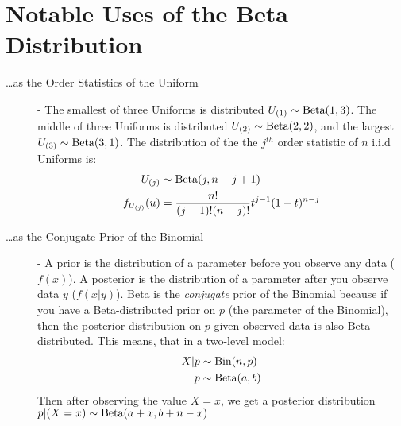 \documentclass[11pt]{article}
\begin{document}
\section*{Notable Uses of the Beta Distribution}
\begin{description}
  \item[\dots as the Order Statistics of the Uniform] -  The smallest of three Uniforms is distributed $U_{(1)} \sim \textrm{Beta}(1, 3)$. The middle of three Uniforms is distributed $U_{(2)} \sim \textrm{Beta}(2, 2)$, and the largest $U_{(3)} \sim \textrm{Beta}(3, 1)$. The distribution of the the $j^{th}$ order statistic of $n$ i.i.d Uniforms is:
  \begin{align*}
    U_{(j)} &\sim \textrm{Beta}(j, n - j + 1) \\
    f_{U_{(j)}}(u) &= \frac{n!}{(j-1)!(n-j)!}t^{j-1}(1-t)^{n-j}
  \end{align*}


  \item[\dots as the Conjugate Prior of the Binomial] - A prior is the distribution of a parameter before you observe any data ($f(x)$). A posterior is the distribution of a parameter after you observe data $y$ ($f(x|y)$). Beta is the \emph{conjugate} prior of the Binomial because if you have a Beta-distributed prior on $p$ (the parameter of the Binomial), then the posterior distribution on $p$ given observed data is also Beta-distributed. This means, that in a two-level model:
  \begin{align*}
    X|p &\sim \textrm{Bin}(n, p) \\
    p &\sim \textrm{Beta}(a, b)
  \end{align*}
Then after observing the value $X = x$, we get a posterior distribution $p|(X=x) \sim \textrm{Beta}(a + x, b + n - x)$
\end{description}
\end{document}
